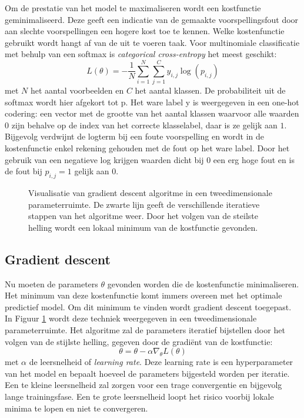 \npar Om de prestatie van het model te maximaliseren wordt een kostfunctie geminimaliseerd. Deze geeft een indicatie van de gemaakte voorspellingsfout door aan slechte voorspellingen een hogere kost toe te kennen. Welke kostenfunctie gebruikt wordt hangt af van de uit te voeren taak. Voor multinomiale classificatie met behulp van een softmax is \textit{categorical cross-entropy} het meest geschikt:
\begin{equation}
L(\theta) = - \frac{1}{N}\sum_{i=1}^{N}\sum_{j=1}^{C}y_{i,j}\log(p_{i,j})
\end{equation}
met $N$ het aantal voorbeelden en $C$ het aantal klassen. De probabiliteit uit de softmax wordt hier afgekort tot p. Het ware label y is weergegeven in een one-hot codering: een vector met de grootte van het aantal klassen waarvoor alle waarden $0$ zijn behalve op de index van het correcte klasselabel, daar is ze gelijk aan $1$. Bijgevolg verdwijnt de logterm bij een foute voorspelling en wordt in de kostenfunctie enkel rekening gehouden met de fout op het ware label. Door het gebruik van een negatieve log krijgen waarden dicht bij $0$ een erg hoge fout en is de fout bij $p_{i,j}=1$ gelijk aan $0$. 
\begin{figure}[t!]
	\centering
	\def\svgwidth{0.6\columnwidth}
	
	\caption{Visualisatie van gradient descent algoritme in een tweedimensionale parameterruimte. De zwarte lijn geeft de verschillende iteratieve stappen van het algoritme weer. Door het volgen van de steilste helling wordt een lokaal minimum van de kostfunctie gevonden.}
	\label{fig:gradient-descent}
\end{figure}
\subsection{Gradient descent}
\npar Nu moeten de parameters $\theta$ gevonden worden die de kostenfunctie minimaliseren. Het minimum van deze kostenfunctie komt immers overeen met het optimale predictief model. Om dit minimum te vinden wordt gradient descent toegepast. In Figuur \ref{fig:gradient-descent} wordt deze techniek weergegeven in een tweedimensionale parameterruimte. Het algoritme zal de parameters iteratief bijstellen door het volgen van de stijlste helling, gegeven door de gradi\"ent van de kostfunctie:
\begin{equation}\label{eq:grad-desc}
\theta = \theta - \alpha \nabla_\theta L(\theta)
\end{equation}
met $\alpha$ de leersnelheid of \textit{learning rate}. Deze learning rate is een hyperparameter van het model en bepaalt hoeveel de parameters bijgesteld worden per iteratie. Een te kleine leersnelheid zal zorgen voor een trage convergentie en bijgevolg lange trainingsfase. Een te grote leersnelheid loopt het risico voorbij lokale minima te lopen en niet te convergeren.

